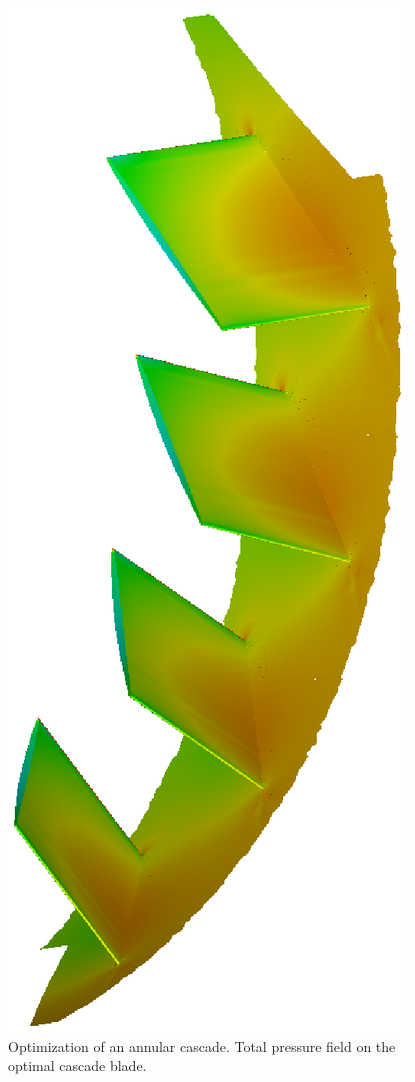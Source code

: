 \documentclass{vki_ls}
\begin{document}
\begin{figure}[h!]
\centering
    \includegraphics[trim=150 50 50 0,clip,angle=270,scale=0.7]{hmaeas/ntuaBv2.eps}
    \caption{Optimization of an annular cascade. Total pressure 
             field on the optimal cascade blade.}
    \label{hmaeas:opt_blade_cpt}
\end{figure}
\end{document}
